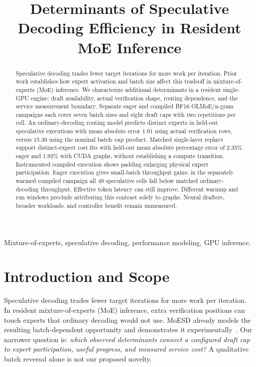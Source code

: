 \documentclass[conference,letterpaper]{IEEEtran}
\title{Determinants of Speculative Decoding Efficiency in Resident MoE Inference}
\author{\IEEEauthorblockN{Working research manuscript}
\IEEEauthorblockA{Author names and affiliations pending}}
\begin{document}
\maketitle
\begin{abstract}
Speculative decoding trades fewer target iterations for more work per iteration. Prior work establishes how expert activation and batch size affect this tradeoff in mixture-of-experts (MoE) inference. We characterize additional determinants in a resident single-GPU engine: draft availability, actual verification shape, routing dependence, and the service measurement boundary. Separate eager and compiled BF16 OLMoE/n-gram campaigns each cover seven batch sizes and eight draft caps with two repetitions per cell. An ordinary-decoding routing model predicts distinct experts in held-out speculative executions with mean absolute error 1.91 using actual verification rows, versus 15.30 using the nominal batch--cap product. Matched single-layer replays support distinct-expert cost fits with held-out mean absolute percentage error of 2.35\% eager and 1.92\% with CUDA graphs, without establishing a compute transition. Instrumented compiled execution shows padding enlarging physical expert participation. Eager execution gives small-batch throughput gains; in the separately warmed compiled campaign all 49 speculative cells fall below matched ordinary-decoding throughput. Effective token latency can still improve. Different warmup and run windows preclude attributing this contrast solely to graphs. Neural drafters, broader workloads, and controller benefit remain unmeasured.
\end{abstract}
\begin{IEEEkeywords}
Mixture-of-experts, speculative decoding, performance modeling, GPU inference.
\end{IEEEkeywords}

\section{Introduction and Scope}
Speculative decoding trades fewer target iterations for more work per iteration. In resident mixture-of-experts (MoE) inference, extra verification positions can touch experts that ordinary decoding would not use. MoESD already models the resulting batch-dependent opportunity and demonstrates it experimentally~\cite{moesd}. Our narrower question is: \emph{which observed determinants connect a configured draft cap to expert participation, useful progress, and measured service cost?} A qualitative batch reversal alone is not our proposed novelty.
\end{document}
